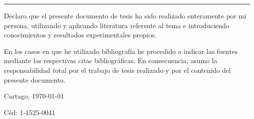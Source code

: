 \thispagestyle{empty}

\rule{10mm}{0pt}

\vfill

Declaro que el presente documento de tesis ha sido realizado enteramente
por mi persona, utilizando y aplicando literatura referente al tema e
introduciendo conocimientos y resultados experimentales propios.

En los casos en que he utilizado bibliografía he procedido a indicar las
fuentes mediante las respectivas citas bibliográficas.  En consecuencia,
asumo la responsabilidad total por el trabajo de tesis realizado y por
el contenido del presente documento.



\vspace*{8mm}

\begin{flushright}
  \scriptAuthor\par
  Cartago, \today\par
  Céd: 1-1525-0041
\end{flushright}

\cleardoublepage

